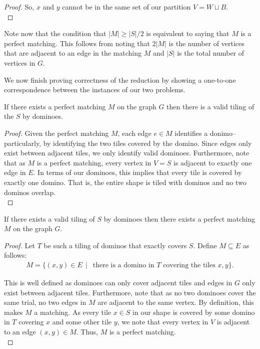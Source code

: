 \documentclass[11pt]{article}
\begin{document}
{\begin{proof}
So, $x$ and $y$ cannot be in the same set of our partition $V = W \sqcup B$. \\
\end{proof}

Note now that the condition that $|M| \ge |S|/2$ is equivalent to saying that $M$ is a perfect matching. This follows from noting that $2 |M|$ is the number of vertices that are adjacent to an edge in the matching $M$ and $|S|$ is the total number of vertices in $G$.

We now finish proving correctness of the reduction by showing a one-to-one correspondence between the instances of our two problems.

\begin{lemma}
  If there exists a perfect matching $M$ on the graph $G$ then there is a valid tiling of the $S$ by dominoes. 
\end{lemma}
\begin{proof}
  Given the perfect matching $M$, each edge $e \in M$ identifies a donimo-- particularly, by identifying the two tiles covered by the domino. Since edges only exist between adjacent tiles, we only identify valid dominoes. Furthermore, note that as $M$ is a perfect matching, every vertex in $V = S$ is adjacent to exactly one edge in $E$. In terms of our dominoes, this implies that every tile is covered by exactly one domino. That is, the entire shape is tiled with dominos and no two dominos overlap. \\
\end{proof}

\begin{lemma}
  If there exists a valid tiling of $S$ by dominoes then there exists a perfect matching $M$ on the graph $G$. 
\end{lemma}
\begin{proof}
  Let $T$ be such a tiling of dominos that exactly covers $S$. Define $M \subseteq E$ as follows:
  \begin{align*}
    M = \{ (x, y) \in E \, \mid \, \text{ there is a domino in } T \text{ covering the tiles } x, y \}.
  \end{align*}

  This is well defined as dominoes can only cover adjacent tiles and edges in $G$ only exist between adjacent tiles. Furthermore, note that as no two dominoes cover the same trial, no two edges in $M$ are adjacent to the same vertex. By definition, this makes $M$ a matching. As every tile $x \in S$ in our shape is covered by some domino in $T$ covering $x$ and some other tile $y$, we note that every vertex in $V$ is adjacent to an edge $(x, y) \in M$. Thus, $M$ is a perfect matching. \\
\end{proof}

}
\end{document}
